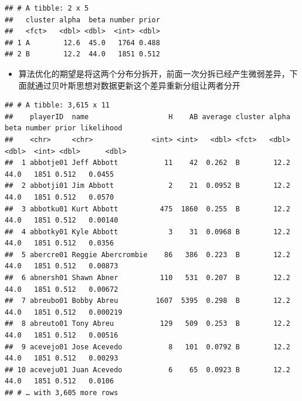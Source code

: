 \documentclass[]{book}
\newenvironment{Shaded}{\begin{snugshade}}{\end{snugshade}}
\newcommand{\CommentTok}[1]{\textcolor[rgb]{0.56,0.35,0.01}{\textit{#1}}}
\newcommand{\DataTypeTok}[1]{\textcolor[rgb]{0.13,0.29,0.53}{#1}}
\newcommand{\DecValTok}[1]{\textcolor[rgb]{0.00,0.00,0.81}{#1}}
\newcommand{\KeywordTok}[1]{\textcolor[rgb]{0.13,0.29,0.53}{\textbf{#1}}}
\newcommand{\NormalTok}[1]{#1}
\newcommand{\OperatorTok}[1]{\textcolor[rgb]{0.81,0.36,0.00}{\textbf{#1}}}
\newcommand{\StringTok}[1]{\textcolor[rgb]{0.31,0.60,0.02}{#1}}
\providecommand{\tightlist}{%
  \setlength{\itemsep}{0pt}\setlength{\parskip}{0pt}}
\begin{document}
\begin{verbatim}
## # A tibble: 2 x 5
##   cluster alpha  beta number prior
##   <fct>   <dbl> <dbl>  <int> <dbl>
## 1 A        12.6  45.0   1764 0.488
## 2 B        12.2  44.0   1851 0.512
\end{verbatim}

\begin{itemize}
\tightlist
\item
  算法优化的期望是将这两个分布分拆开，前面一次分拆已经产生微弱差异，下面就通过贝叶斯思想对数据更新这个差异重新分组让两者分开
\end{itemize}

\begin{Shaded}
\end{Shaded}

\begin{verbatim}
## # A tibble: 3,615 x 11
##    playerID  name                   H    AB average cluster alpha  beta number prior likelihood
##    <chr>     <chr>              <int> <int>   <dbl> <fct>   <dbl> <dbl>  <int> <dbl>      <dbl>
##  1 abbotje01 Jeff Abbott           11    42  0.262  B        12.2  44.0   1851 0.512   0.0455  
##  2 abbotji01 Jim Abbott             2    21  0.0952 B        12.2  44.0   1851 0.512   0.0570  
##  3 abbotku01 Kurt Abbott          475  1860  0.255  B        12.2  44.0   1851 0.512   0.00140 
##  4 abbotky01 Kyle Abbott            3    31  0.0968 B        12.2  44.0   1851 0.512   0.0356  
##  5 abercre01 Reggie Abercrombie    86   386  0.223  B        12.2  44.0   1851 0.512   0.00873 
##  6 abnersh01 Shawn Abner          110   531  0.207  B        12.2  44.0   1851 0.512   0.00672 
##  7 abreubo01 Bobby Abreu         1607  5395  0.298  B        12.2  44.0   1851 0.512   0.000219
##  8 abreuto01 Tony Abreu           129   509  0.253  B        12.2  44.0   1851 0.512   0.00516 
##  9 acevejo01 Jose Acevedo           8   101  0.0792 B        12.2  44.0   1851 0.512   0.00293 
## 10 aceveju01 Juan Acevedo           6    65  0.0923 B        12.2  44.0   1851 0.512   0.0106  
## # … with 3,605 more rows
\end{verbatim}
\end{document}
